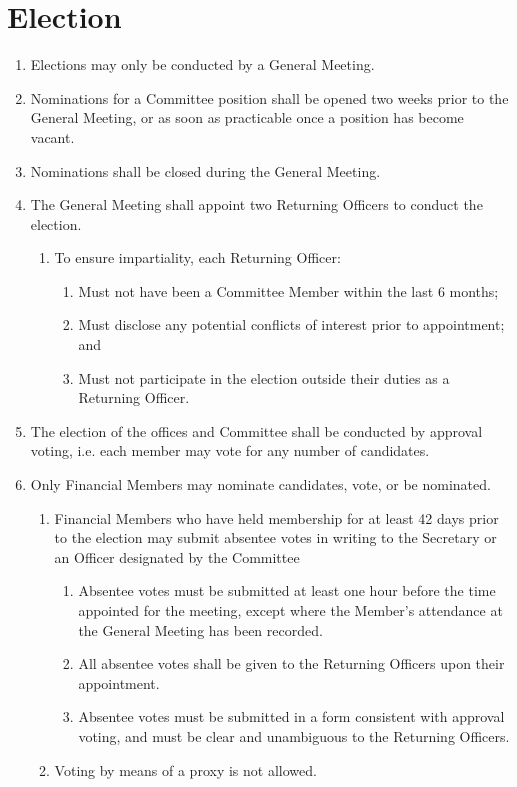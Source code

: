 \documentclass[a4paper]{article}
\begin{document}
\section{Election} \label{sec:elections}
\begin{enumerate}
    \item Elections may only be conducted by a General Meeting.
    \item Nominations for a Committee position shall be opened two weeks prior to the General Meeting, or as soon as practicable once a position has become vacant.
    \item Nominations shall be closed during the General Meeting.
    \item The General Meeting shall appoint two Returning Officers to conduct the election.
    \begin{enumerate}
        \item To ensure impartiality, each Returning Officer:
        \begin{enumerate}
            \item Must not have been a Committee Member within the last 6 months;
            \item Must disclose any potential conflicts of interest prior to appointment; and
            \item Must not participate in the election outside their duties as a Returning Officer.
        \end{enumerate}
    \end{enumerate}
    \item The election of the offices and Committee shall be conducted by approval voting, i.e. each member may vote for any number of candidates.
    \item Only Financial Members may nominate candidates, vote, or be nominated.
        \begin{enumerate}
            \item Financial Members who have held membership for at least 42 days prior to the election may submit absentee votes in writing to the Secretary or an Officer designated by the Committee
            \begin{enumerate}
                \item Absentee votes must be submitted at least one hour before the time appointed for the meeting, except where the Member’s attendance at the General Meeting has been recorded.
                \item All absentee votes shall be given to the Returning Officers upon their appointment.
                \item Absentee votes must be submitted in a form consistent with approval voting, and must be clear and unambiguous to the Returning Officers.
            \end{enumerate}
            \item Voting by means of a proxy is not allowed.
        \end{enumerate}
\end{enumerate}
\end{document}
